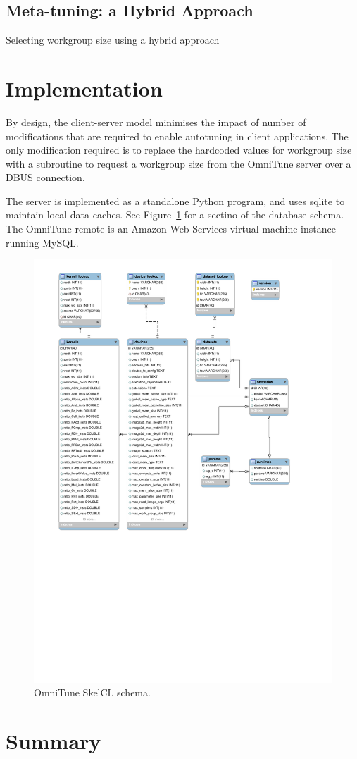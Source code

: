 % 


\subsection{Meta-tuning: a Hybrid Approach}


\begin{algorithm}

\caption{Selecting workgroup size using a hybrid approach}
\label{alg:autotune-hybrid}
\end{algorithm}


\section{Implementation}

By design, the client-server model minimises the impact of number of
modifications that are required to enable autotuning in client
applications. The only modification required is to replace the
hardcoded values for workgroup size with a subroutine to request a
workgroup size from the OmniTune server over a DBUS connection.

The server is implemented as a standalone Python program, and uses
sqlite to maintain local data caches. See
Figure~\ref{fig:omnitune-system-flow} for a sectino of the database
schema. The OmniTune remote is an Amazon Web Services virtual machine
instance running MySQL.

\begin{figure}
\centering
\includegraphics[width=.75\textwidth]{img/omnitune-data-schema.pdf}
\caption[Database schema for OmniTune remote]{%
  OmniTune SkelCL schema.%
}
\label{fig:omnitune-system-flow}
\end{figure}


\section{Summary}

\TODO{\ldots}
